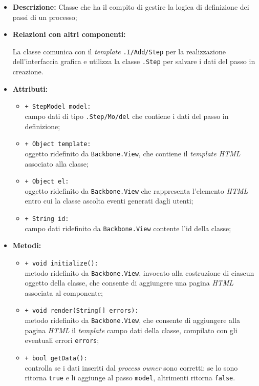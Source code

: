 \begin{flushleft}
\begin{itemize}
\item \textbf{Descrizione:} Classe che ha il compito di gestire la logica di definizione dei passi di un processo;
\item \textbf{Relazioni con altri componenti:}
\begin{sloppypar}
La classe comunica con il \textit{template} \texttt{\viewAdmin{}.I\fshyp{}Add\fshyp{}Step} per la realizzazione dell'interfaccia grafica e utilizza la classe \texttt{\model{}.Step} per salvare i dati del passo in creazione.
\end{sloppypar}
\item \textbf{Attributi:}
\begin{sloppypar}
\begin{itemize}
\item \texttt{+ StepModel model:}\\ campo dati di tipo \texttt{\model{}.Step\fshyp{}Mo\fshyp{}del} che contiene i dati del passo in definizione;
\item \texttt{+ Object template:}\\ oggetto ridefinito da \texttt{Backbone.View}, che contiene il \textit{template HTML} associato alla classe;
\item \texttt{+ Object el:}\\ oggetto ridefinito da \texttt{Backbone.View} che rappresenta l'elemento \textit{HTML} entro cui la classe ascolta eventi generati dagli utenti;
\item \texttt{+ String id:}\\ campo dati ridefinito da \texttt{Backbone.View} contente l'id della classe;
\end{itemize}
\end{sloppypar}
\item \textbf{Metodi:}
\begin{sloppypar}
\begin{itemize}
\item \texttt{+ void initialize():}\\ metodo ridefinito da \texttt{Backbone.View}, invocato alla costruzione di ciascun oggetto della classe, che consente di aggiungere una pagina \textit{HTML} associata al componente;
\item \texttt{+ void render(String[] errors):}\\ metodo ridefinito da \texttt{Backbone.View}, che consente di aggiungere alla pagina \textit{HTML} il \textit{template} campo dati della classe, compilato con gli eventuali errori \texttt{errors};
\item \texttt{+ bool getData():}\\ controlla se i dati inseriti dal \textit{process owner} sono corretti: se lo sono ritorna \texttt{true} e li aggiunge al passo \texttt{model}, altrimenti ritorna \texttt{false}.
\end{itemize}
\end{sloppypar}
\end{itemize}
\end{flushleft}


